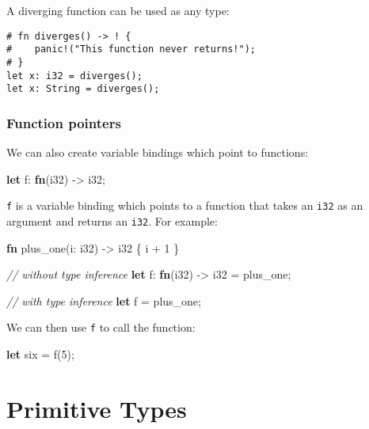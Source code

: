 \documentclass[a4paper,]{book}
\newenvironment{Shaded}{\begin{snugshade}}{\end{snugshade}}
\newcommand{\KeywordTok}[1]{\textcolor[rgb]{0.13,0.29,0.53}{\textbf{{#1}}}}
\newcommand{\DataTypeTok}[1]{\textcolor[rgb]{0.13,0.29,0.53}{{#1}}}
\newcommand{\DecValTok}[1]{\textcolor[rgb]{0.00,0.00,0.81}{{#1}}}
\newcommand{\CommentTok}[1]{\textcolor[rgb]{0.56,0.35,0.01}{\textit{{#1}}}}
\newcommand{\NormalTok}[1]{{#1}}
\begin{document}
A diverging function can be used as any type:

\begin{verbatim}
# fn diverges() -> ! {
#    panic!("This function never returns!");
# }
let x: i32 = diverges();
let x: String = diverges();
\end{verbatim}

\subsubsection{Function pointers}\label{function-pointers}

We can also create variable bindings which point to functions:

\begin{Shaded}
\begin{Highlighting}[]
\KeywordTok{let} \NormalTok{f: }\KeywordTok{fn}\NormalTok{(}\DataTypeTok{i32}\NormalTok{) -> }\DataTypeTok{i32}\NormalTok{;}
\end{Highlighting}
\end{Shaded}

\texttt{f} is a variable binding which points to a function that takes
an \texttt{i32} as an argument and returns an \texttt{i32}. For example:

\begin{Shaded}
\begin{Highlighting}[]
\KeywordTok{fn} \NormalTok{plus_one(i: }\DataTypeTok{i32}\NormalTok{) -> }\DataTypeTok{i32} \NormalTok{\{}
    \NormalTok{i + }\DecValTok{1}
\NormalTok{\}}

\CommentTok{// without type inference}
\KeywordTok{let} \NormalTok{f: }\KeywordTok{fn}\NormalTok{(}\DataTypeTok{i32}\NormalTok{) -> }\DataTypeTok{i32} \NormalTok{= plus_one;}

\CommentTok{// with type inference}
\KeywordTok{let} \NormalTok{f = plus_one;}
\end{Highlighting}
\end{Shaded}

We can then use \texttt{f} to call the function:

\begin{Shaded}
\begin{Highlighting}[]
\KeywordTok{let} \NormalTok{six = f(}\DecValTok{5}\NormalTok{);}
\end{Highlighting}
\end{Shaded}

\section{Primitive Types}\label{sec--primitive-types}
\end{document}

